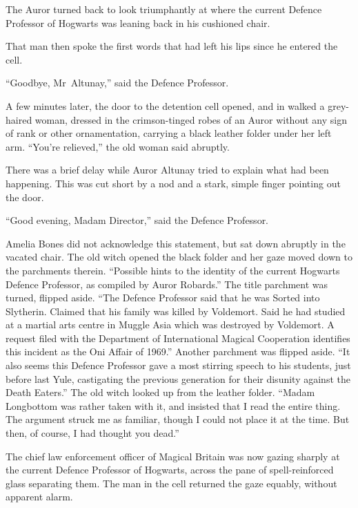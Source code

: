 The Auror turned back to look triumphantly at where the current Defence Professor of Hogwarts was leaning back in his cushioned chair.

That man then spoke the first words that had left his lips since he entered the cell.

“Goodbye, Mr~Altunay,” said the Defence Professor.

A few minutes later, the door to the detention cell opened, and in walked a grey-haired woman, dressed in the crimson-tinged robes of an Auror without any sign of rank or other ornamentation, carrying a black leather folder under her left arm. “You’re relieved,” the old woman said abruptly.

There was a brief delay while Auror Altunay tried to explain what had been happening. This was cut short by a nod and a stark, simple finger pointing out the door.

“Good evening, Madam Director,” said the Defence Professor.

Amelia Bones did not acknowledge this statement, but sat down abruptly in the vacated chair. The old witch opened the black folder and her gaze moved down to the parchments therein. “Possible hints to the identity of the current Hogwarts Defence Professor, as compiled by Auror Robards.” The title parchment was turned, flipped aside. “The Defence Professor said that he was Sorted into Slytherin. Claimed that his family was killed by Voldemort. Said he had studied at a martial arts centre in Muggle Asia which was destroyed by Voldemort. A request filed with the Department of International Magical Cooperation identifies this incident as the Oni Affair of 1969.” Another parchment was flipped aside. “It also seems this Defence Professor gave a most stirring speech to his students, just before last Yule, castigating the previous generation for their disunity against the Death Eaters.” The old witch looked up from the leather folder. “Madam Longbottom was rather taken with it, and insisted that I read the entire thing. The argument struck me as familiar, though I could not place it at the time. But then, of course, I had thought you dead.”

The chief law enforcement officer of Magical Britain was now gazing sharply at the current Defence Professor of Hogwarts, across the pane of spell-reinforced glass separating them. The man in the cell returned the gaze equably, without apparent alarm.

